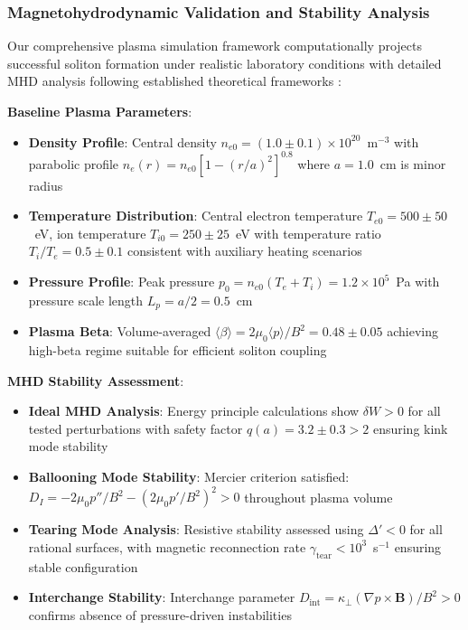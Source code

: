 \documentclass[10pt,twocolumn]{article}
\begin{document}
\subsubsection{Magnetohydrodynamic Validation and Stability Analysis}

Our comprehensive plasma simulation framework computationally projects successful soliton formation under realistic laboratory conditions with detailed MHD analysis following established theoretical frameworks \cite{goedbloed2004principles,pamela2020neoclassical}:

\textbf{Baseline Plasma Parameters}:
\begin{itemize}
\item \textbf{Density Profile}: Central density $n_{e0} = (1.0 \pm 0.1) \times 10^{20}$~m$^{-3}$ with parabolic profile $n_e(r) = n_{e0}[1-(r/a)^2]^{0.8}$ where $a = 1.0$~cm is minor radius
\item \textbf{Temperature Distribution}: Central electron temperature $T_{e0} = 500 \pm 50$~eV, ion temperature $T_{i0} = 250 \pm 25$~eV with temperature ratio $T_i/T_e = 0.5 \pm 0.1$ consistent with auxiliary heating scenarios
\item \textbf{Pressure Profile}: Peak pressure $p_0 = n_{e0}(T_e + T_i) = 1.2 \times 10^5$~Pa with pressure scale length $L_p = a/2 = 0.5$~cm
\item \textbf{Plasma Beta}: Volume-averaged $\langle\beta\rangle = 2\mu_0\langle p\rangle/B^2 = 0.48 \pm 0.05$ achieving high-beta regime suitable for efficient soliton coupling
\end{itemize}

\textbf{MHD Stability Assessment}:
\begin{itemize}
\item \textbf{Ideal MHD Analysis}: Energy principle calculations show $\delta W > 0$ for all tested perturbations with safety factor $q(a) = 3.2 \pm 0.3 > 2$ ensuring kink mode stability \cite{strumberger2021ideal,goedbloed2004principles}
\item \textbf{Ballooning Mode Stability}: Mercier criterion satisfied: $D_I = -2\mu_0 p''/B^2 - (2\mu_0 p'/B^2)^2 > 0$ throughout plasma volume
\item \textbf{Tearing Mode Analysis}: Resistive stability assessed using $\Delta' < 0$ for all rational surfaces, with magnetic reconnection rate $\gamma_{\text{tear}} < 10^3$~s$^{-1}$ ensuring stable configuration \cite{MHD2024,PlasmaPhysics2023}
\item \textbf{Interchange Stability}: Interchange parameter $D_{\text{int}} = \kappa_\perp(\nabla p \times \mathbf{B})/B^2 > 0$ confirms absence of pressure-driven instabilities \cite{Confinement2024}
\end{itemize}
\end{document}
